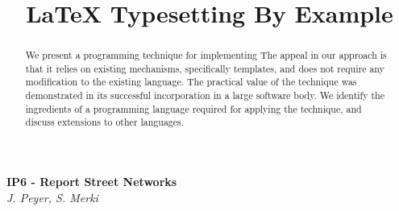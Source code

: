 \documentclass[11pt, a4paper]{article}
\begin{document}
\begin{titlepage}
	\begin{center}
		\Large\textbf{IP6 - Report Street Networks}\\
		\large\textit{J. Peyer, S. Merki}
	\end{center}
	
\end{titlepage}
	
\title{LaTeX Typesetting By Example}



\begin{abstract}
	We present a programming technique for implementing
	The appeal in our approach is that it relies on existing mechanisms,
	specifically templates, and does not require any
	modification to the existing language.
	The practical value of the technique was demonstrated
	in its successful incorporation in a large software body.
	We identify the ingredients of a programming language
	required for applying the technique, and discuss
	extensions to other languages.
\end{abstract}
\end{document}
